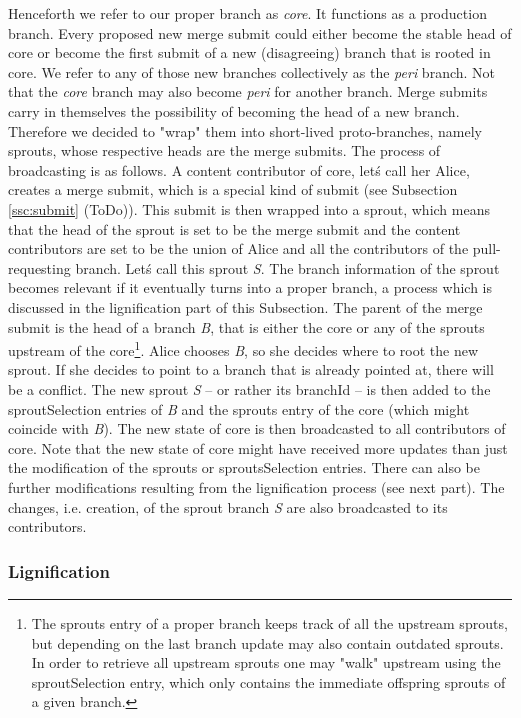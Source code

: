 \documentclass[14pt]{article}
\newcommand{\remark}[1]{{\color{purple} (#1)}}
\begin{document}
Henceforth we refer to our proper branch as \textit{core}. It functions as a production branch. Every proposed new merge submit could either become the stable head of core or become the first submit of a new (disagreeing) branch that is rooted in core. We refer to any of those new branches collectively as the \textit{peri} branch. Not that the \textit{core} branch may also become \textit{peri} for another branch. Merge submits carry in themselves the possibility of becoming the head of a new branch. Therefore we decided to "wrap" them into short-lived proto-branches, namely sprouts, whose respective heads are the merge submits. The process of broadcasting is as follows. A content contributor of core, let\'s call her Alice, creates a merge submit, which is a special kind of submit (see Subsection \ref{ssc:submit} \remark{ToDo}). This submit is then wrapped into a sprout, which means that the head of the sprout is set to be the merge submit and the content contributors are set to be the union of Alice and all the contributors of the pull-requesting branch. Let\'s call this sprout \textit{S}. The branch information of the sprout becomes relevant if it eventually turns into a proper branch, a process which is discussed in the lignification part of this Subsection. The parent of the merge submit is the head of a branch \textit{B}, that is either the core or any of the sprouts upstream of the core\footnote{The sprouts entry of a proper branch keeps track of all the upstream sprouts, but depending on the last branch update may also contain outdated sprouts. In order to retrieve all upstream sprouts one may "walk" upstream using the sproutSelection entry, which only contains the immediate offspring sprouts of a given branch.}. Alice chooses \textit{B}, so she decides where to root the new sprout. If she decides to point to a branch that is already pointed at, there will be a conflict. The new sprout \textit{S} -- or rather its branchId -- is then added to the sproutSelection entries of \textit{B} and the sprouts entry of the core (which might coincide with \textit{B}). The new state of core is then broadcasted to all contributors of core. Note that the new state of core might have received more updates than just the modification of the sprouts or sproutsSelection entries. There can also be further modifications resulting from the lignification process (see next part). The changes, i.e. creation, of the sprout branch \textit{S} are also broadcasted to its contributors. 

\subsubsection*{Lignification}
\end{document}
